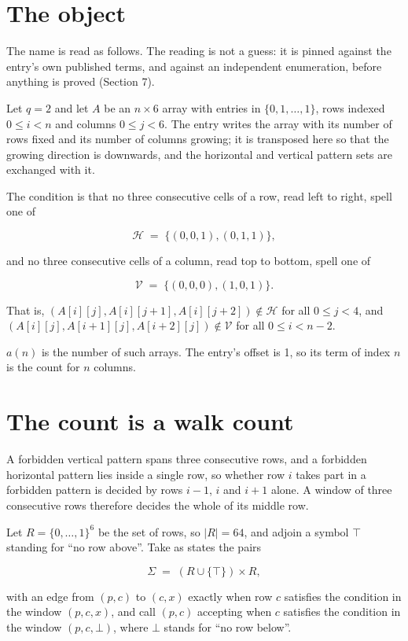 \documentclass[11pt]{article}
\theoremstyle{definition}
\begin{document}
\section{The object}

The name is read as follows. The reading is not a guess: it is pinned against the entry's own published terms, and against an independent enumeration, before anything is proved (Section 7).

Let $q = 2$ and let $A$ be an $n \times 6$ array with entries in $\{0,1,\dots,1\}$, rows indexed $0 \le i < n$ and columns $0 \le j < 6$. The entry writes the array with its number of rows fixed and its number of columns growing; it is transposed here so that the growing direction is downwards, and the horizontal and vertical pattern sets are exchanged with it.

The condition is that no three consecutive cells of a row, read left to right, spell one of

\[\mathcal{H} \;=\; \{(0,0,1), (0,1,1)\},\]

and no three consecutive cells of a column, read top to bottom, spell one of

\[\mathcal{V} \;=\; \{(0,0,0), (1,0,1)\}.\]

That is, $(A[i][j],A[i][j{+}1],A[i][j{+}2]) \notin \mathcal{H}$ for all $0 \le j < 4$, and $(A[i][j],A[i{+}1][j],A[i{+}2][j]) \notin \mathcal{V}$ for all $0 \le i < n-2$.

$a(n)$ is the number of such arrays. The entry's offset is 1, so its term of index $n$ is the count for $n$ columns.

\section{The count is a walk count}

A forbidden vertical pattern spans three consecutive rows, and a forbidden horizontal pattern lies inside a single row, so whether row $i$ takes part in a forbidden pattern is decided by rows $i-1$, $i$ and $i+1$ alone. A window of three consecutive rows therefore decides the whole of its middle row.

Let $R = \{0,\dots,1\}^{6}$ be the set of rows, so $|R| = 64$, and adjoin a symbol $\top$ standing for ``no row above''. Take as states the pairs

\[\Sigma \;=\; (R \cup \{\top\}) \times R,\]

with an edge from $(p,c)$ to $(c,x)$ exactly when row $c$ satisfies the condition in the window $(p,c,x)$, and call $(p,c)$ accepting when $c$ satisfies the condition in the window $(p,c,\bot)$, where $\bot$ stands for ``no row below''.
\end{document}
